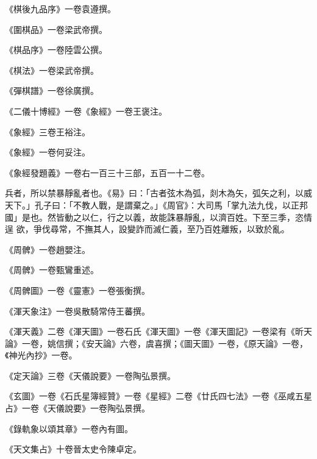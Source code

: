 \begin{pinyinscope}
 《棋後九品序》一卷袁遵撰。



 《圍棋品》一卷梁武帝撰。



 《棋品序》一卷陸雲公撰。



 《棋法》一卷梁武帝撰。



 《彈棋譜》一卷徐廣撰。



 《二儀十博經》一卷《象經》一卷王褒注。



 《象經》三卷王裕注。



 《象經》一卷何妥注。



 《象經發題義》一卷右一百三十三部，五百一十二卷。



 兵者，所以禁暴靜亂者也。《易》曰：「古者弦木為弧，剡木為矢，弧矢之利，以威天下。」孔子曰：「不教人戰，是謂棄之。」《周官》：大司馬「掌九法九伐，以正邦國」是也。然皆動之以仁，行之以義，故能誅暴靜亂，以濟百姓。下至三季，恣情逞
 欲，爭伐尋常，不撫其人，設變詐而滅仁義，至乃百姓離叛，以致於亂。



 《周髀》一卷趙嬰注。



 《周髀》一卷甄鸞重述。



 《周髀圖》一卷《靈憲》一卷張衡撰。



 《渾天象注》一卷吳散騎常侍王蕃撰。



 《渾天義》二卷《渾天圖》一卷石氏《渾天圖》一卷《渾天圖記》一卷梁有《昕天論》一卷，姚信撰；《安天論》六卷，虞喜撰；《圖天圖》一卷，《原天論》一卷，《神光內抄》一卷。



 《定天論》三卷《天儀說要》一卷陶弘景撰。



 《玄圖》一卷《石氏星簿經贊》一卷《星經》二卷《廿氏四七法》一卷《巫咸五星占》一卷《天儀說要》一卷陶弘景撰。



 《錄軌象以頌其章》一卷內有圖。



 《天文集占》十卷晉太史令陳卓定。




\end{pinyinscope}
